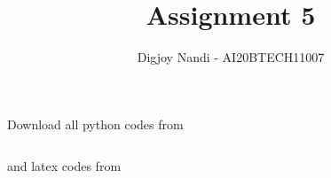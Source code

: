 \documentclass[journal,12pt,twocolumn]{IEEEtran}
\DeclareMathOperator*{\Res}{Res}
\begin{document}
\newcommand{\BEQA}{\begin{eqnarray}}
\newcommand{\EEQA}{\end{eqnarray}}
\newcommand{\define}{\stackrel{\triangle}{=}}

\raggedbottom
\setlength{\parindent}{0pt}
\providecommand{\mbf}{\mathbf}
\providecommand{\pr}[1]{\ensuremath{\Pr\left(#1\right)}}
\providecommand{\qfunc}[1]{\ensuremath{Q\left(#1\right)}}
\providecommand{\sbrak}[1]{\ensuremath{{}\left[#1\right]}}
\providecommand{\lsbrak}[1]{\ensuremath{{}\left[#1\right.}}
\providecommand{\rsbrak}[1]{\ensuremath{{}\left.#1\right]}}
\providecommand{\brak}[1]{\ensuremath{\left(#1\right)}}
\providecommand{\lbrak}[1]{\ensuremath{\left(#1\right.}}
\providecommand{\rbrak}[1]{\ensuremath{\left.#1\right)}}
\providecommand{\cbrak}[1]{\ensuremath{\left\{#1\right\}}}
\providecommand{\lcbrak}[1]{\ensuremath{\left\{#1\right.}}
\providecommand{\rcbrak}[1]{\ensuremath{\left.#1\right\}}}
\theoremstyle{remark}
\newtheorem{rem}{Remark}
\newcommand{\sgn}{\mathop{\mathrm{sgn}}}
\providecommand{\abs}[1]{\vert#1\vert}
\providecommand{\res}[1]{\Res\displaylimits_{#1}} 
\providecommand{\norm}[1]{\lVert#1\rVert}
\providecommand{\mtx}[1]{\mathbf{#1}}
\providecommand{\mean}[1]{E[ #1 ]}
\providecommand{\fourier}{\overset{\mathcal{F}}{ \rightleftharpoons}}
\providecommand{\system}{\overset{\mathcal{H}}{ \longleftrightarrow}}
\newcommand{\solution}{\noindent \textbf{Solution: }}
\newcommand{\cosec}{\,\text{cosec}\,}
\providecommand{\dec}[2]{\ensuremath{\overset{#1}{\underset{#2}{\gtrless}}}}
\newcommand{\myvec}[1]{\ensuremath{\begin{pmatrix}#1\end{pmatrix}}}
\newcommand{\mydet}[1]{\ensuremath{\begin{vmatrix}#1\end{vmatrix}}}
\makeatletter
{}
\makeatother
\let\StandardTheFigure\thefigure
\let\vec\mathbf
\renewcommand{\thefigure}{\theproblem}
\def\putbox#1#2#3{\makebox[0in][l]{\makebox[#1][l]{}\raisebox{\baselineskip}[0in][0in]{\raisebox{#2}[0in][0in]{#3}}}}
     \def\rightbox#1{\makebox[0in][r]{#1}}
     \def\centbox#1{\makebox[0in]{#1}}
     \def\topbox#1{\raisebox{-\baselineskip}[0in][0in]{#1}}
     \def\midbox#1{\raisebox{-0.5\baselineskip}[0in][0in]{#1}}
\vspace{3cm}
\title{Assignment 5}
\author{Digjoy Nandi - AI20BTECH11007}
\maketitle
\newpage
\bigskip
\renewcommand{\thefigure}{\theenumi}
\renewcommand{\thetable}{\theenumi}
Download all python codes from 
\begin{lstlisting}

\end{lstlisting}
%
and latex codes from 
%
\begin{lstlisting}

\end{lstlisting}
\end{document}
